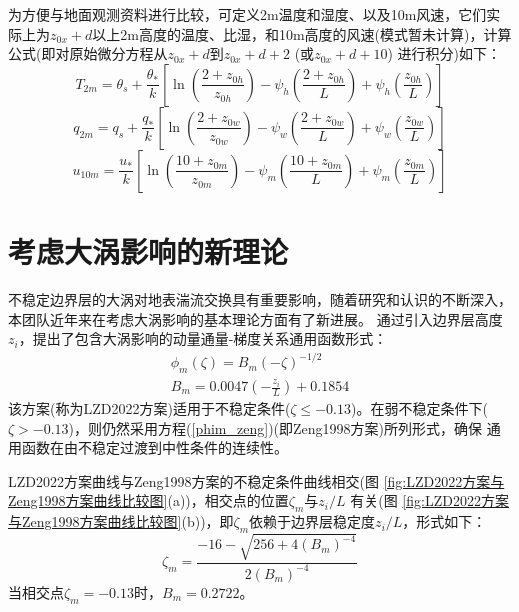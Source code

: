 为方便与地面观测资料进行比较，可定义2m温度和湿度、以及10m风速，它们实际上为$z_{0x}+d$以上2m高度的温度、比湿，和10m高度的风速(模式暂未计算)，计算公式(即对原始微分方程从$z_{0x}+d$到$z_{0x}+d+2$ (或$z_{0x}+d+10$) 进行积分)如下：
\begin{equation}\label{T2m}
T_{2 m}=\theta_{s}+\frac{\theta_{*}}{k}\left[\ln \left(\frac{2+z_{0 h}}{z_{0 h}}\right)-\psi_{h}\left(\frac{2+z_{0 h}}{L}\right)+\psi_{h}\left(\frac{z_{0 h}}{L}\right)\right]
\end{equation}
\begin{equation}\label{q2m}
q_{2 m}=q_{s}+\frac{q_{*}}{k}\left[\ln \left(\frac{2+z_{0 w}}{z_{0 w}}\right)-\psi_{w}\left(\frac{2+z_{0 w}}{L}\right)+\psi_{w}\left(\frac{z_{0 w}}{L}\right)\right]
\end{equation}
\begin{equation}
u_{10 m}=\frac{u_{*}}{k}\left[\ln \left(\frac{10+z_{0 m}}{z_{0 m}}\right)-\psi_{m}\left(\frac{10+z_{0 m}}{L}\right)+\psi_{m}\left(\frac{z_{0 m}}{L}\right)\right]
\end{equation}


\section{考虑大涡影响的新理论}\label{考虑大涡影响的新理论}
不稳定边界层的大涡对地表湍流交换具有重要影响，随着研究和认识的不断深入，本团队近年来在考虑大涡影响的基本理论方面有了新进展。\citet{liu2019further,liu2022surface}
通过引入边界层高度$z_i$，提出了包含大涡影响的动量通量-梯度关系通用函数形式：
\begin{equation}
     \begin{array}{c}\phi_{m}(\zeta)=B_{m} (-\zeta)^{-1/2} \\
          B_{m}=0.0047(-\frac{z_{i}}{L})+0.1854
     \end{array}
\end{equation}
该方案(称为LZD2022方案)适用于不稳定条件($\zeta \leq -0.13$)。在弱不稳定条件下($\zeta > -0.13$)，则仍然采用方程(\ref{phim_zeng})(即Zeng1998方案)所列形式，确保
通用函数在由不稳定过渡到中性条件的连续性。

LZD2022方案曲线与Zeng1998方案的不稳定条件曲线相交(图 \ref{fig:LZD2022方案与Zeng1998方案曲线比较图}(a))，相交点的位置$\zeta_{m}$与${z_{i}}/{L}$
有关(图 \ref{fig:LZD2022方案与Zeng1998方案曲线比较图}(b))，即$\zeta_{m}$依赖于边界层稳定度${z_{i}}/{L}$，形式如下：
\begin{equation}
     \zeta_{m}=\frac{-16-\sqrt{256+4 \left(B_{m}\right)^{-4}}}{2 \left(B_{m}\right)^{-4}}
\end{equation}
当相交点$\zeta_{m}=-0.13$时，$B_{m}=0.2722$。

